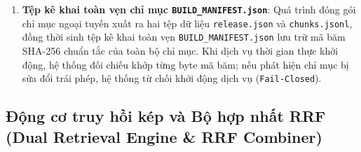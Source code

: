 \begin{enumerate}[nosep]
\begin{itemize}[nosep]
    \item \textit{Chọn điểm cắt và kiểm tra lại (\texttt{\_fit})}: Hàm dùng tìm kiếm nhị phân để chọn một tiền tố, sau đó đếm token lại và thu ngắn nếu còn vượt ngân sách. Do BPE không bảo đảm số token tăng đơn điệu theo số ký tự, không khẳng định điểm tìm được là tiền tố dài nhất có thể. Điều kiện cần kiểm chứng là đoạn cuối cùng cùng ngữ cảnh không vượt giới hạn token.
  \end{itemize}
  \item \textbf{Tệp kê khai toàn vẹn chỉ mục \texttt{BUILD\_MANIFEST.json}}: Quá trình đóng gói chỉ mục ngoại tuyến xuất ra hai tệp dữ liệu \texttt{release.json} và \texttt{chunks.jsonl}, đồng thời sinh tệp kê khai toàn vẹn \texttt{BUILD\_MANIFEST.json} lưu trữ mã băm SHA-256 chuẩn tắc của toàn bộ chỉ mục. Khi dịch vụ thời gian thực khởi động, hệ thống đối chiếu khớp từng byte mã băm; nếu phát hiện chỉ mục bị sửa đổi trái phép, hệ thống từ chối khởi động dịch vụ (\texttt{Fail-Closed}).
\end{enumerate}

\subsection{Động cơ truy hồi kép và Bộ hợp nhất RRF (Dual Retrieval Engine \& RRF Combiner)}

